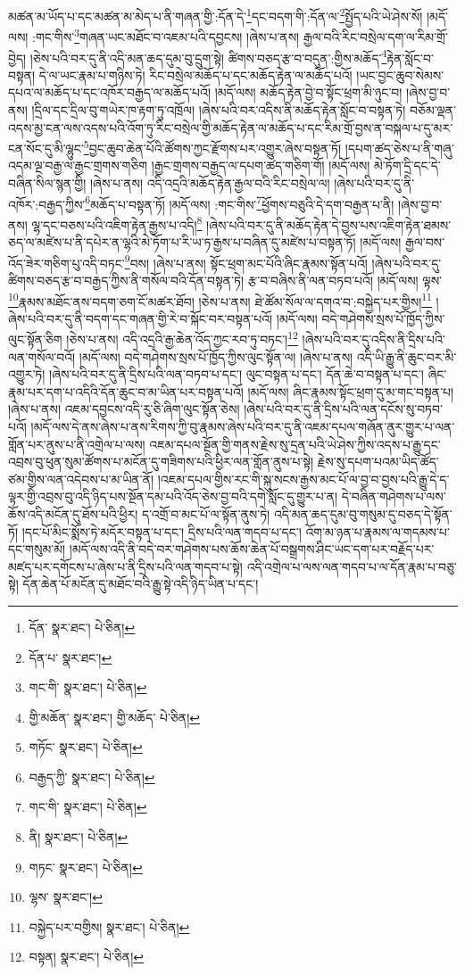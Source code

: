 མཚན་མ་ཡོད་པ་དང་མཚན་མ་མེད་པ་ནི་གཞན་གྱི་:དོན་དེ་\footnote{དོན་  སྣར་ཐང་།  པེ་ཅིན། }དང་བདག་གི་:དོན་ལ་\footnote{དོན་པ་  སྣར་ཐང་། }སྤྱོད་པའི་ཡེ་ཤེས་སོ། །མདོ་ལས། :གང་གིས་\footnote{གང་གི་  སྣར་ཐང་།  པེ་ཅིན། }གཞན་ཡང་མཐོང་བ་འཇམ་པའི་དབྱངས། །ཞེས་པ་ནས། རྒྱལ་བའི་རིང་བསྲེལ་དག་ལ་རིམ་གྲོ་བྱེད། །ཅེས་པའི་བར་དུ་ནི་འདི་མན་ཆད་དུམ་བུ་དྲུག་སྟེ། ཚིགས་བཅད་རྩ་བ་བདུན་:གྱིས་མཆོད་\footnote{གྱི་མཆོན་  སྣར་ཐང་། གྱི་མཆོད་  པེ་ཅིན། }རྟེན་སློང་བ་བསྟན། དེ་ལ་ཡང་རྣམ་པ་གཉིས་ཏེ། རིང་བསྲེལ་མཆོད་པ་དང་མཆོད་རྟེན་ལ་མཆོད་པའོ། །ཡང་བྱང་ཆུབ་སེམས་དཔའ་ལ་མཆོད་པ་དང་འཁོར་བརྒྱད་ལ་མཆོད་པའོ། །མདོ་ལས། མཆོད་རྟེན་བྱེ་བ་སྟོང་ཕྲག་མི་ཉུང་བ། །ཞེས་བྱ་བ་ནས། །དྲིལ་དང་དྲིལ་བུ་གཡེར་ཁ་རྟག་ཏུ་འཁྲོལ། །ཞེས་པའི་བར་འདིས་ནི་མཆོད་རྟེན་སློང་བ་བསྟན་ཏེ། བཅོམ་ལྡན་འདས་མྱ་ངན་ལས་འདས་པའི་འོག་ཏུ་རིང་བསྲེལ་གྱི་མཆོད་རྟེན་ལ་མཆོད་པ་དང་རིམ་གྲོ་བྱས་ན་བསྐལ་པ་དུ་མར་ངན་སོང་དུ་མི་ལྷུང་\footnote{གཏོང་  སྣར་ཐང་།  པེ་ཅིན། }བྱང་ཆུབ་ཆེན་པོའི་ཚོགས་ཀྱང་རྫོགས་པར་འགྱུར་ཞེས་བསྟན་ཏོ། །དཔག་ཚད་ཅེས་པ་ནི་གཞུ་འདམ་ལྔ་བརྒྱ་ལ་རྒྱང་གྲགས་གཅིག །རྒྱང་གྲགས་བརྒྱད་ལ་དཔག་ཚད་གཅིག་གོ། །མདོ་ལས། མེ་ཏོག་དྲི་དང་དེ་བཞིན་སིལ་སྙན་གྱི། །ཞེས་པ་ནས། འདི་འདྲའི་མཆོད་རྟེན་རྒྱལ་བའི་རིང་བསྲེལ་ལ། །ཞེས་པའི་བར་དུ་ནི་འཁོར་:བརྒྱད་ཀྱིས་\footnote{བརྒྱད་ཀྱི་  སྣར་ཐང་།  པེ་ཅིན། }མཆོད་པ་བསྟན་ཏོ། །མདོ་ལས། :གང་གིས་\footnote{གང་གི་  སྣར་ཐང་།  པེ་ཅིན། }ཕྱོགས་བཅུའི་དེ་དག་བརྒྱན་པ་ནི། །ཞེས་བྱ་བ་ནས། ལྷ་དང་བཅས་པའི་འཇིག་རྟེན་རྒྱས་པ་འདི།\footnote{ནི།  སྣར་ཐང་།  པེ་ཅིན། } །ཞེས་པའི་བར་དུ་ནི་མཆོད་རྟེན་དེ་བྱས་པས་འཇིག་རྟེན་ཐམས་ཅད་ལ་མཛེས་པ་ནི་དཔེར་ན་ལྷའི་མེ་ཏོག་པ་རི་ཡ་ཏ་རྒྱས་པ་བཞིན་དུ་མཛེས་པ་བསྟན་ཏོ། །མདོ་ལས། རྒྱལ་བས་འོད་ཟེར་གཅིག་པུ་འདི་བཏང་\footnote{གཏང་  སྣར་ཐང་།  པེ་ཅིན། }བས། །ཞེས་པ་ནས། སྟོང་ཕྲག་མང་པོའི་ཞིང་རྣམས་སྟོན་པའོ། །ཞེས་པའི་བར་དུ་ཚིགས་བཅད་རྩ་བ་བརྒྱད་ཀྱིས་ནི་གསོལ་བའི་དོན་བསྟན་ཏེ། རྩ་བ་བཞིས་ནི་ལན་བཏབ་པའོ། །མདོ་ལས། ལྟས་\footnote{ལྷས་  སྣར་ཐང་། }རྣམས་མཐོང་ནས་བདག་ཅག་ངོ་མཚར་ཐོབ། །ཅེས་པ་ནས། ཐེ་ཚོམ་སོལ་ལ་དགའ་བ་:བསྐྱེད་པར་གྱིས།\footnote{བསྐྱེད་པར་བགྱིས།  སྣར་ཐང་།  པེ་ཅིན། } །ཞེས་པའི་བར་དུ་ནི་བདག་དང་གཞན་གྱི་རེ་བ་སྐོང་བར་བསྟན་པའོ། །མདོ་ལས། བདེ་གཤེགས་སྲས་པོ་ཁྱོད་ཀྱིས་ལུང་སྟོན་ཅིག །ཅེས་པ་ནས། འདི་འདྲའི་རྒྱ་ཆེན་འོད་ཀྱང་རབ་ཏུ་བཏང་།\footnote{བསྟན།  སྣར་ཐང་།  པེ་ཅིན། } །ཞེས་པའི་བར་དུ་འདིས་ནི་དྲིས་པའི་ལན་གསོལ་བའོ། །མདོ་ལས། བདེ་གཤེགས་སྲས་པོ་ཁྱོད་ཀྱིས་ལུང་སྟོན་ལ། །ཞེས་པ་ནས། འདི་ཡི་རྒྱུ་ནི་ཆུང་བར་མི་འགྱུར་ཏེ། །ཞེས་པའི་བར་དུ་ནི་དྲིས་པའི་ལན་བཏབ་པ་དང་། ལུང་བསྟན་པ་དང་། དོན་ཆེ་བ་བསྟན་པ་དང་། ཞིང་རྣམ་པར་དག་པ་འདིའི་དོན་ཆུང་བ་མ་ཡིན་པར་བསྟན་པའོ། །མདོ་ལས། ཞིང་རྣམས་སྟོང་ཕྲག་དུ་མ་གང་བསྟན་པ། །ཞེས་པ་ནས། འཇམ་དབྱངས་འདི་རུ་ཅི་ཞིག་ལུང་སྟོན་ཅེས། །ཞེས་པའི་བར་དུ་ནི་དྲིས་པའི་ལན་དངོས་སུ་བཏབ་པའོ། །མདོ་ལས་དེ་ནས་ཞེས་པ་ནས་རིགས་ཀྱི་བུ་རྣམས་ཞེས་པའི་བར་དུ་ནི་འཇམ་དཔལ་གཞོན་ནུར་གྱུར་པ་ལན་གློན་པར་ནུས་པ་ནི་འགྲེལ་པ་ལས། འཇམ་དཔལ་སྔོན་གྱི་གནས་རྗེས་སུ་དྲན་པའི་ཡེ་ཤེས་ཀྱིས་འདས་པ་རྒྱུ་དང་འབྲས་བུ་ཕུན་སུམ་ཚོགས་པ་མངོན་དུ་གཟིགས་པའི་ཕྱིར་ལན་གློན་ནུས་པ་སྟེ། རྗེས་སུ་དཔག་པའམ་ཡིད་ཚོད་ཙམ་གྱིས་ལན་འདེབས་པ་མ་ཡིན་ནོ། །འཇམ་དཔལ་གྱིས་རང་གི་སྐུ་སངས་རྒྱས་མང་པོ་ལ་བྱ་བ་བྱས་པའི་རྒྱུ་དེ་ད་ལྟར་གྱི་འབྲས་བུ་འདི་ཉིད་པས་སྔོན་དམ་པའི་འོད་ཅེས་བྱ་བའི་དགེ་སློང་དུ་གྱུར་པ་ན། དེ་བཞིན་གཤེགས་པ་ལས་ཆོས་འདི་མངོན་དུ་ཐོས་པའི་ཕྱིར། ད་འགྲོ་བ་མང་པོ་ལ་སྟོན་ནུས་ཏེ། འདི་མན་ཆད་དུམ་བུ་གསུམ་དུ་བཅད་དེ་སྟོན་ཏོ། །དང་པོ་མིང་སྨོས་ཏེ་མདོར་བསྟན་པ་དང་། དྲིས་པའི་ལན་གདབ་པ་དང་། འོག་མ་ཉན་པ་རྣམས་ལ་གདམས་པ་དང་གསུམ་མོ། །མདོ་ལས་འདི་ནི་བདེ་བར་གཤེགས་པས་ཆོས་ཆེན་པོ་བསྒྲགས་ཤིང་ཡང་དག་པར་བརྗོད་པར་མཛད་པར་དགོངས་པ་ཞེས་པ་ནི་དྲིས་པའི་ལན་གདབ་པ་སྟེ། འདི་འགྲེལ་པ་ལས་ལན་གདབ་པ་ལ་དོན་རྣམ་པ་བཅུ་སྟེ། དོན་ཆེན་པོ་མངོན་དུ་མཐོང་བའི་རྒྱུ་སྟེ་འདི་ཉིད་ཡིན་པ་དང་། 